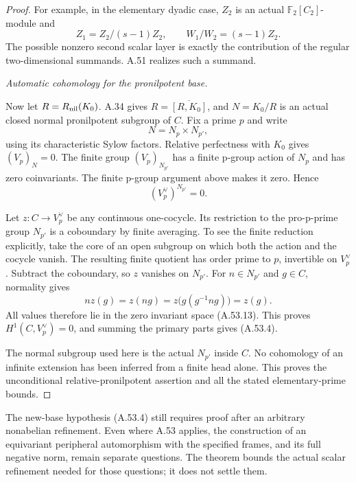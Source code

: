 \begin{proof}
For example, in the elementary dyadic case,
\(Z_2\) is an actual
\(\mathbb F_2[C_2]\)-module and
\[
 Z_1=Z_2/(s-1)Z_2,
 \qquad W_1/W_2=(s-1)Z_2.
                                                               \tag{A.53.12}
\]
The possible nonzero second scalar layer is
exactly the contribution of the regular
two-dimensional summands. A.51 realizes such
a summand.

\emph{Automatic cohomology for the pronilpotent base.}\par
Now let \(R=R_{\rm nil}(K_0)\).
A.34 gives \(R=\overline{[R,K_0]}\), and
\(N=K_0/R\) is an actual closed normal
pronilpotent subgroup of \(C\).
Fix a prime \(p\) and write
\[
                         N=N_p\times N_{p'},
\]
using its characteristic Sylow factors.
Relative perfectness with \(K_0\) gives
\((V_p)_N=0\). The finite group
\((V_p)_{N_{p'}}\) has a finite p-group
action of \(N_p\) and has zero coinvariants.
The finite p-group argument above makes it
zero. Hence
\[
                         (V_p^\vee)^{N_{p'}}=0.
                                                               \tag{A.53.13}
\]

Let \(z:C\to V_p^\vee\) be any continuous
one-cocycle. Its restriction to the pro-p-prime
group \(N_{p'}\) is a coboundary by finite
averaging. To see the finite reduction
explicitly, take the core of an open subgroup
on which both the action and the cocycle
vanish. The resulting finite quotient has
order prime to \(p\), invertible on
\(V_p^\vee\).
Subtract the coboundary, so \(z\) vanishes
on \(N_{p'}\). For \(n\in N_{p'}\) and
\(g\in C\), normality gives
\[
 nz(g)=z(ng)=z\bigl(g(g^{-1}ng)\bigr)=z(g).
\]
All values therefore lie in the zero invariant
space (A.53.13). This proves
\(H^1(C,V_p^\vee)=0\), and summing the
primary parts gives (A.53.4).

The normal subgroup used here is the actual
\(N_{p'}\) inside \(C\). No cohomology of an
infinite extension has been inferred from a
finite head alone. This proves the unconditional
relative-pronilpotent assertion and all the
stated elementary-prime bounds.
\end{proof}

The new-base hypothesis (A.53.4) still requires
proof after an arbitrary nonabelian refinement.
Even where A.53 applies, the construction of an
equivariant peripheral automorphism with the
specified frames, and its full negative norm,
remain separate questions. The theorem bounds
the actual scalar refinement needed for those
questions; it does not settle them.

